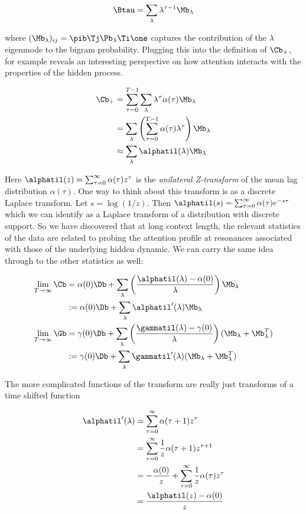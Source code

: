 \documentclass{article}
\begin{document}
\begin{equation}
    \Btau = \sum_\lambda \lambda^{\tau-1} \Mb_\lambda
\end{equation}

where $(\Mb_\lambda)_{ij}  = \pib \Tj \Pb_\lambda \Ti \one$ captures the contribution of the $\lambda$ eigenmode to the bigram probability. Plugging this into the definition of $\Cb_+$, for example reveals an interesting perspective on how attention interacts with the properties of the hidden process.

\begin{align}
    \Cb_+ &= \sum_{\tau=0}^{T-1} \sum_\lambda \lambda^\tau \alpha(\tau) \Mb_\lambda \\
    &= \sum_\lambda \left ( \sum_{\tau=0}^{T-1}  \alpha(\tau) \lambda^\tau  \right) \Mb_\lambda \\
    &\approx \sum_{\lambda} \alphatil(\lambda)\Mb_\lambda
\end{align}

Here $\alphatil(z) = \sum_{\tau=0}^{\infty}  \alpha(\tau) z^\tau $ is the \textit{unilateral Z-transform} of the mean lag distribution $\alpha(\tau)$. One way to think about this transform is as a discrete Laplace transform. Let $s = \log(1/z)$. Then $\alphatil(s) = \sum_{\tau=0}^{\infty}  \alpha(\tau) e^{-s\tau} $ which we can identify as a Laplace transform of a distribution with discrete support. So we have discovered that at long context length, the relevant statistics of the data are related to probing the attention profile at resonances associated with those of the underlying hidden dynamic. We can carry the same idea through to the other statistics as well:

\begin{align}
    \lim_{T \to \infty}\Cb &= \alpha(0)\Db + \sum_\lambda\left (\frac{\alphatil(\lambda) - \alpha(0)}{\lambda}\right) \Mb_\lambda \\
    &:= \alpha(0)\Db + \sum_\lambda \alphatil'(\lambda) \Mb_\lambda \\
    \lim_{T \to \infty}\Gb &= \gamma(0)\Db + \sum_\lambda\left (\frac{\gammatil(\lambda) - \gamma(0)}{\lambda}\right) (\Mb_\lambda + \Mb_\lambda^T)\\
    &:= \gamma(0)\Db + \sum_\lambda\gammatil'(\lambda) (\Mb_\lambda + \Mb_\lambda^T)
\end{align}

The more complicated functions of the transform are really just transforms of a time shifted function 

\begin{align}
    \alphatil'(\lambda) &= \sum_{\tau = 0}^\infty \alpha(\tau + 1) z^{\tau}\\
    &= \sum_{\tau = 0}^\infty \frac{1}{z}\alpha(\tau + 1) z^{\tau + 1} \\
    &=  - \frac{\alpha(0)}{z} + \sum_{\tau = 0}^\infty \frac{1}{z}\alpha(\tau) z^{\tau} \\
    &= \frac{\alphatil(z) - \alpha(0)}{z}
\end{align}
\end{document}

